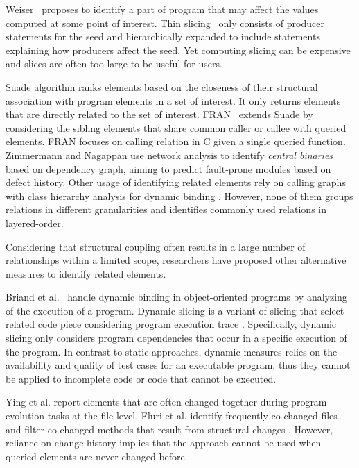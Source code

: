\documentclass{sig-alternate}
\begin{document}
 Weiser~\cite{Weiser:slice84} proposes to identify  a part of program that may affect the values computed at some point of interest. Thin slicing~\cite{Bodik:slicePLSI07} only consists of producer statements for the seed and hierarchically expanded to include statements explaining how producers affect the seed. Yet computing slicing can be expensive and slices are often too large to be useful for users. 


 Suade algorithm \cite{Robillard:FSE05}  ranks elements based on the closeness of their structural association with program elements in a set of interest. It only returns elements that are directly related to the set of interest. FRAN~\cite{Devanbu:randomWalk07} extends Suade by considering the sibling elements that share common caller or callee with queried elements. FRAN focuses on calling relation in C given a single queried function. Zimmermann and Nagappan \cite{Zimmermann:ICSE08} use network analysis to identify  {\em central binaries} based on dependency graph, aiming to predict fault-prone modules based on defect history. Other usage of identifying related elements rely on calling graphs with class hierarchy analysis for dynamic binding \cite{PRMiner:FSE05, Orso:impactDynamic03, Murphy:nlConcern11}. However, none of them groups relations in different granularities and identifies commonly used relations in layered-order. 
 
Considering that structural coupling often results in a large number of relationships within a limited scope, researchers have proposed other alternative measures to identify related elements.

Briand et al.~\cite{Briand:dynamicTSE04} handle dynamic binding in object-oriented programs by analyzing of the execution of a program. Dynamic slicing is a variant of slicing that select related code piece considering program execution trace \cite{Agrawal:dynamicSlice90}. Specifically, dynamic slicing only considers program dependencies that occur in a specific execution of the program. In contrast to static approaches, dynamic measures relies on the availability and quality of test cases for an executable program, thus they cannot be applied to incomplete code or code that cannot be executed. 

 Ying et al.\cite{Ying:cochangeTSE04} report elements that are often changed together during program evolution tasks at the file level, Fluri et al.\/ identify frequently co-changed files and filter co-changed methods that result from structural changes \cite{Gall:changeCouple05}. However, reliance on change history implies that the approach cannot be used when queried elements are never changed before. 
\end{document}
